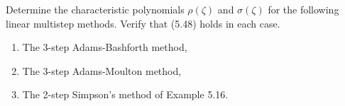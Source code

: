 

Determine the characteristic polynomials $\rho(\zeta)$ and $\sigma(\zeta)$
for the following linear multistep methods.  Verify that (5.48) holds in
each case.

\begin{enumerate}
\item The 3-step Adams-Bashforth method,
\item The 3-step Adams-Moulton method,
\item The 2-step Simpson's method of Example 5.16.
\end{enumerate} 
